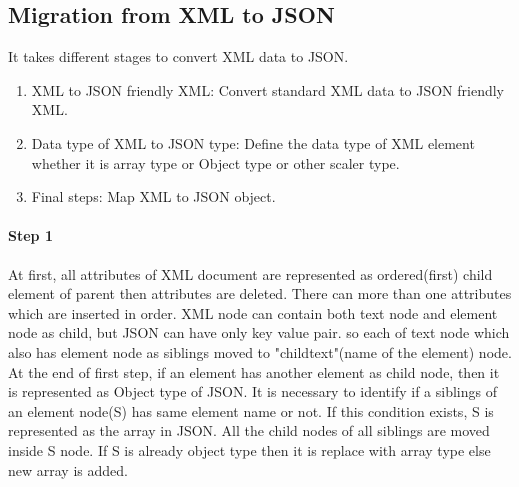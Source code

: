 \documentclass[a4paper,12pt]{article}
\begin{document}
\subsection{Migration from XML to JSON}
It takes different stages to convert XML data to JSON.
		\begin{enumerate}[label=Step\arabic*.]
			\item
			XML to JSON friendly XML: Convert standard XML data to JSON friendly XML.
			\item
			Data type of XML to JSON type: Define the data type of XML element whether it is array type or Object type or other scaler type.
			\item
			Final steps: Map XML to JSON object.
		\end{enumerate}
		\paragraph{Step 1}
		At first, all attributes of XML document are represented as ordered(first) child element of parent then attributes are deleted. There can more than one attributes which are inserted in order. XML node can contain both text node and element node as child, but JSON can have only key value pair. so each of text node which also  has element node as siblings moved to "childtext"(name of the element) node. At the end of first step, if an element has another element as child node, then it is represented as Object type of JSON. It is necessary to identify if a siblings of an element node(S) has same element name or not. If this condition exists, S is represented as the array in JSON. All the child nodes of all siblings are moved inside S node. If S is already  object type  then it is replace with array type  else new array is added. %
		
\end{document}
